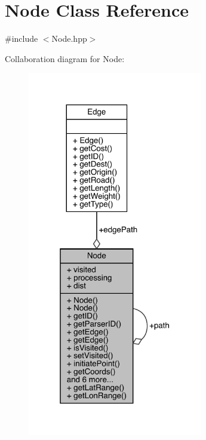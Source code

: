 \hypertarget{class_node}{}\section{Node Class Reference}
\label{class_node}


{\ttfamily \#include $<$Node.\+hpp$>$}



Collaboration diagram for Node\+:\nopagebreak
\begin{figure}[H]
\begin{center}
\leavevmode
\includegraphics[width=217pt]{class_node__coll__graph}
\end{center}
\end{figure}
